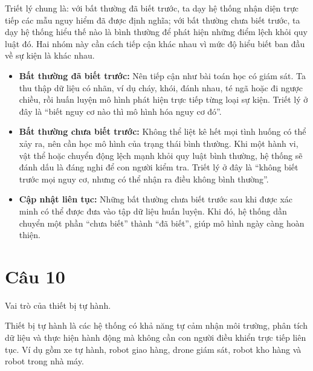 Triết lý chung là: với bất thường đã biết trước, ta dạy hệ thống nhận diện trực tiếp các mẫu nguy hiểm đã được định nghĩa; với bất thường chưa biết trước, ta dạy hệ thống hiểu thế nào là bình thường để phát hiện những điểm lệch khỏi quy luật đó. Hai nhóm này cần cách tiếp cận khác nhau vì mức độ hiểu biết ban đầu về sự kiện là khác nhau.

\begin{itemize}
    \item \textbf{Bất thường đã biết trước:} Nên tiếp cận như bài toán học có giám sát. Ta thu thập dữ liệu có nhãn, ví dụ cháy, khói, đánh nhau, té ngã hoặc đi ngược chiều, rồi huấn luyện mô hình phát hiện trực tiếp từng loại sự kiện. Triết lý ở đây là ``biết nguy cơ nào thì mô hình hóa nguy cơ đó''.

    \item \textbf{Bất thường chưa biết trước:} Không thể liệt kê hết mọi tình huống có thể xảy ra, nên cần học mô hình của trạng thái bình thường. Khi một hành vi, vật thể hoặc chuyển động lệch mạnh khỏi quy luật bình thường, hệ thống sẽ đánh dấu là đáng nghi để con người kiểm tra. Triết lý ở đây là ``không biết trước mọi nguy cơ, nhưng có thể nhận ra điều không bình thường''.

    \item \textbf{Cập nhật liên tục:} Những bất thường chưa biết trước sau khi được xác minh có thể được đưa vào tập dữ liệu huấn luyện. Khi đó, hệ thống dần chuyển một phần ``chưa biết'' thành ``đã biết'', giúp mô hình ngày càng hoàn thiện.
\end{itemize}


\section*{Câu 10}
Vai trò của thiết bị tự hành.

Thiết bị tự hành là các hệ thống có khả năng tự cảm nhận môi trường, phân tích dữ liệu và thực hiện hành động mà không cần con người điều khiển trực tiếp liên tục. Ví dụ gồm xe tự hành, robot giao hàng, drone giám sát, robot kho hàng và robot trong nhà máy.

